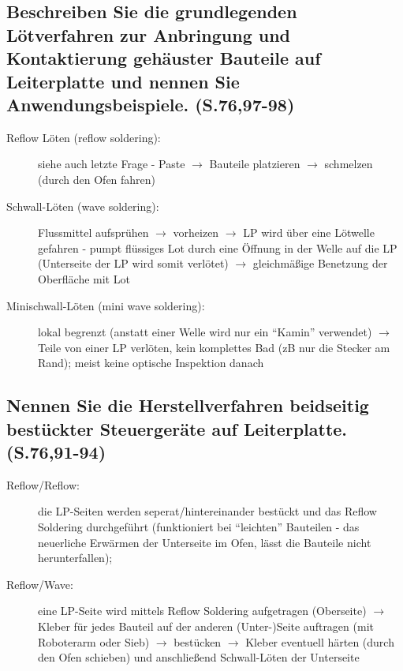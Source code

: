 \subsection{Beschreiben Sie die grundlegenden Lötverfahren zur Anbringung und Kontaktierung gehäuster Bauteile auf Leiterplatte und nennen Sie Anwendungsbeispiele. (S.76,97-98)}
\begin{description}
\item[Reflow Löten (reflow soldering):] siehe auch letzte Frage - Paste $\rightarrow$ Bauteile
  platzieren $\rightarrow$ schmelzen (durch den Ofen fahren)
\item[Schwall-Löten (wave soldering):] Flussmittel aufsprühen $\rightarrow$ vorheizen $\rightarrow$ 
  LP wird über eine Lötwelle gefahren - pumpt flüssiges Lot durch eine Öffnung in der Welle auf die 
  LP (Unterseite der LP wird somit verlötet) $\rightarrow$ gleichmäßige Benetzung der Oberfläche mit
  Lot
\item[Minischwall-Löten (mini wave soldering):] lokal begrenzt (anstatt einer Welle wird nur ein 
  ``Kamin'' verwendet) $\rightarrow$ Teile von einer LP verlöten, kein komplettes Bad (zB nur die 
  Stecker am Rand); meist keine optische Inspektion danach
\end{description}

\subsection{Nennen Sie die Herstellverfahren beidseitig bestückter Steuergeräte auf Leiterplatte. (S.76,91-94)}
\begin{description}
\item[Reflow/Reflow:] die LP-Seiten werden seperat/hintereinander bestückt und das Reflow Soldering 
  durchgeführt (funktioniert bei ``leichten'' Bauteilen - das neuerliche Erwärmen der Unterseite im 
  Ofen, lässt die Bauteile nicht herunterfallen);
\item[Reflow/Wave:] eine LP-Seite wird mittels Reflow Soldering aufgetragen (Oberseite) 
  $\rightarrow$ Kleber für jedes Bauteil auf der anderen (Unter-)Seite auftragen (mit Roboterarm 
  oder Sieb) $\rightarrow$ bestücken $\rightarrow$ Kleber eventuell härten (durch den Ofen schieben) 
  und anschließend Schwall-Löten der Unterseite
\end{description}


